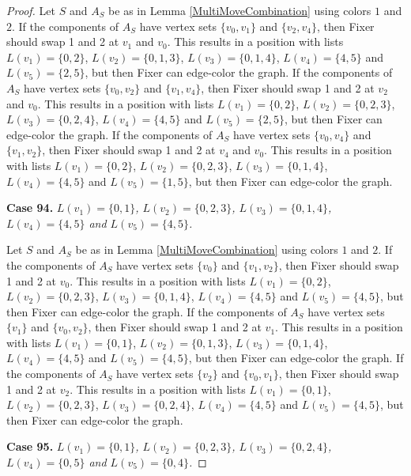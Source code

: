 \documentclass[12pt]{amsart}
\theoremstyle{plain}
\theoremstyle{definition}
\theoremstyle{remark}
\begin{document}
\begin{proof}
Let $S$ and $A_S$ be as in Lemma \ref{MultiMoveCombination} using colors $1$ and $2$. If the components of $A_S$ have vertex sets $\{v_0, v_1\}$ and $\{v_2, v_4\}$, then Fixer should swap 1 and 2 at $v_1$ and $v_0$. This results in a position with lists $L(v_1) = \{0, 2\}$, $L(v_2) = \{0, 1, 3\}$, $L(v_3) = \{0, 1, 4\}$, $L(v_4) = \{4, 5\}$ and $L(v_5) = \{2, 5\}$, but then Fixer can edge-color the graph.
If the components of $A_S$ have vertex sets $\{v_0, v_2\}$ and $\{v_1, v_4\}$, then Fixer should swap 1 and 2 at $v_2$ and $v_0$. This results in a position with lists $L(v_1) = \{0, 2\}$, $L(v_2) = \{0, 2, 3\}$, $L(v_3) = \{0, 2, 4\}$, $L(v_4) = \{4, 5\}$ and $L(v_5) = \{2, 5\}$, but then Fixer can edge-color the graph.
If the components of $A_S$ have vertex sets $\{v_0, v_4\}$ and $\{v_1, v_2\}$, then Fixer should swap 1 and 2 at $v_4$ and $v_0$. This results in a position with lists $L(v_1) = \{0, 2\}$, $L(v_2) = \{0, 2, 3\}$, $L(v_3) = \{0, 1, 4\}$, $L(v_4) = \{4, 5\}$ and $L(v_5) = \{1, 5\}$, but then Fixer can edge-color the graph.

\noindent\textbf{Case 94.  }\textit{$L(v_1) = \{0, 1\}$, $L(v_2) = \{0, 2, 3\}$, $L(v_3) = \{0, 1, 4\}$, $L(v_4) = \{4, 5\}$ and $L(v_5) = \{4, 5\}$.}

Let $S$ and $A_S$ be as in Lemma \ref{MultiMoveCombination} using colors $1$ and $2$. If the components of $A_S$ have vertex sets $\{v_0\}$ and $\{v_1, v_2\}$, then Fixer should swap 1 and 2 at $v_0$. This results in a position with lists $L(v_1) = \{0, 2\}$, $L(v_2) = \{0, 2, 3\}$, $L(v_3) = \{0, 1, 4\}$, $L(v_4) = \{4, 5\}$ and $L(v_5) = \{4, 5\}$, but then Fixer can edge-color the graph.
If the components of $A_S$ have vertex sets $\{v_1\}$ and $\{v_0, v_2\}$, then Fixer should swap 1 and 2 at $v_1$. This results in a position with lists $L(v_1) = \{0, 1\}$, $L(v_2) = \{0, 1, 3\}$, $L(v_3) = \{0, 1, 4\}$, $L(v_4) = \{4, 5\}$ and $L(v_5) = \{4, 5\}$, but then Fixer can edge-color the graph.
If the components of $A_S$ have vertex sets $\{v_2\}$ and $\{v_0, v_1\}$, then Fixer should swap 1 and 2 at $v_2$. This results in a position with lists $L(v_1) = \{0, 1\}$, $L(v_2) = \{0, 2, 3\}$, $L(v_3) = \{0, 2, 4\}$, $L(v_4) = \{4, 5\}$ and $L(v_5) = \{4, 5\}$, but then Fixer can edge-color the graph.

\noindent\textbf{Case 95.  }\textit{$L(v_1) = \{0, 1\}$, $L(v_2) = \{0, 2, 3\}$, $L(v_3) = \{0, 2, 4\}$, $L(v_4) = \{0, 5\}$ and $L(v_5) = \{0, 4\}$.}


\end{proof}
\end{document}
